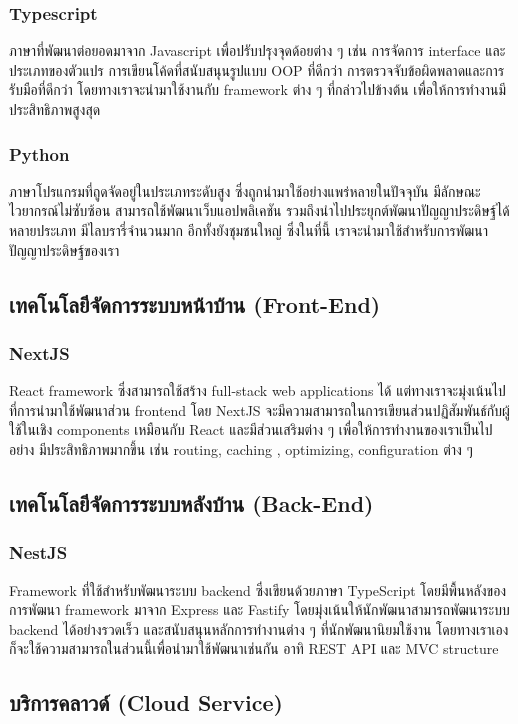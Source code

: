 \subsubsection{Typescript}
ภาษาที่พัฒนาต่อยอดมาจาก Javascript เพื่อปรับปรุงจุดด้อยต่าง ๆ เช่น การจัดการ 
interface และประเภทของตัวแปร การเขียนโค้ดที่สนับสนุนรูปแบบ OOP ที่ดีกว่า 
การตรวจจับข้อผิดพลาดและการรับมือที่ดีกว่า โดยทางเราจะนำมาใช้งานกับ framework 
ต่าง ๆ ที่กล่าวไปข้างต้น เพื่อให้การทำงานมีประสิทธิภาพสูงสุด
\subsubsection{Python}
ภาษาโปรแกรมที่ถูดจัดอยู่ในประเภทระดับสูง ซึ่งถูกนำมาใช้อย่างแพร่หลายในปัจจุบัน 
มีลักษณะไวยากรณ์ไม่ซับซ้อน สามารถใช้พัฒนาเว็บแอปพลิเคชัน 
รวมถึงนำไปประยุกต์พัฒนาปัญญาประดิษฐ์ได้หลายประเภท 
มีไลบรารี่จำนวนมาก อีกทั้งยังชุมชนใหญ่ ซึ่งในที่นี้ เราจะนำมาใช้สำหรับการพัฒนาปัญญาประดิษฐ์ของเรา
\subsection{เทคโนโลยีจัดการระบบหน้าบ้าน (Front-End)}
\subsubsection{NextJS}
React framework ซึ่งสามารถใช้สร้าง full-stack web applications ได้ 
แต่ทางเราจะมุ่งเน้นไปที่การนำมาใช้พัฒนาส่วน frontend โดย NextJS 
จะมีความสามารถในการเขียนส่วนปฏิสัมพันธ์กับผู้ใช้ในเชิง components 
เหมือนกับ React และมีส่วนเสริมต่าง ๆ เพื่อให้การทำงานของเราเป็นไปอย่าง
มีประสิทธิภาพมากขึ้น เช่น routing, caching , optimizing, configuration 
ต่าง ๆ
\subsection{เทคโนโลยีจัดการระบบหลังบ้าน (Back-End)}
\subsubsection{NestJS}
Framework ที่ใช้สำหรับพัฒนาระบบ backend ซึ่งเขียนด้วยภาษา TypeScript 
โดยมีพื้นหลังของการพัฒนา framework มาจาก Express และ Fastify 
โดยมุ่งเน้นให้นักพัฒนาสามารถพัฒนาระบบ backend ได้อย่างรวดเร็ว 
และสนับสนุนหลักการทำงานต่าง ๆ ที่นักพัฒนานิยมใช้งาน 
โดยทางเราเองก็จะใช้ความสามารถในส่วนนี้เพื่อนำมาใช้พัฒนาเช่นกัน อาทิ REST API 
และ MVC structure
\subsection{บริการคลาวด์ (Cloud Service)}
